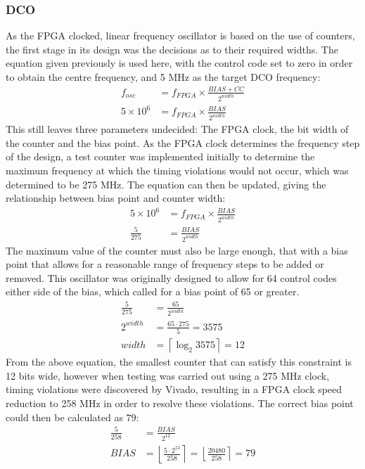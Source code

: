 \subsubsection{\acl{DCO}}
As the \ac{FPGA} clocked, linear frequency oscillator is based on the use of counters, the first stage in its design was the decisions as to their required widths. The equation given previously is used here, with the control code set to zero in order to obtain the centre frequency, and 5 MHz as the target \ac{DCO} frequency:
\begin{align}
f_{osc} &= f_{FPGA}\times\frac{BIAS+CC}{2^{width}}\\
5\times 10^6 &= f_{FPGA}\times\frac{BIAS}{2^{width}}
\end{align}
This still leaves three parameters undecided: The \ac{FPGA} clock, the bit width of the counter and the bias point. As the \ac{FPGA} clock determines the frequency step of the design, a test counter was implemented initially to determine the maximum frequency at which the timing violations would not occur, which was determined to be 275 MHz. The equation can then be updated, giving the relationship between bias point and counter width:
\begin{align}
5\times 10^6 &= f_{FPGA}\times\frac{BIAS}{2^{width}}\\
\frac{5}{275} &= \frac{BIAS}{2^{width}}
\end{align}
The maximum value of the counter must also be large enough, that with a bias point that allows for a reasonable range of frequency steps to be added or removed. 
This oscillator was originally designed to allow for 64 control codes either side of the bias, which called for a bias point of 65 or greater.
\begin{align}
\frac{5}{275} &= \frac{65}{2^{width}}\\
2^{width} &= \frac{65\cdot275}{5} = 3575 \\
width &= \left \lceil{\log_2 3575}\right \rceil = 12
\end{align}
From the above equation, the smallest counter that can satisfy this constraint is 12 bits wide, however when testing was carried out using a 275 MHz clock, timing violations were discovered by Vivado, resulting in a \ac{FPGA} clock speed reduction to 258 MHz in order to resolve these violations. The correct bias point could then be calculated as $79$:
\begin{align}
\frac{5}{258} &= \frac{BIAS}{2^{12}}\\
 BIAS &= \left \lfloor{\frac{5\cdot 2^{12}}{258}}\right \rceil = \left \lfloor{\frac{20480}{258}}\right \rceil = 79
\end{align}
